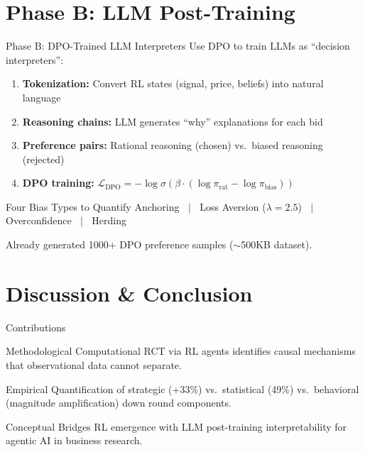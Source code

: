 \documentclass[aspectratio=169]{beamer}
\begin{document}
\section{Phase B: LLM Post-Training}

\begin{frame}{Phase B: DPO-Trained LLM Interpreters}
  Use DPO \citep{rafailov2023} to train LLMs as ``decision interpreters'':

  \begin{enumerate}
    \item \textbf{Tokenization:} Convert RL states (signal, price, beliefs) into natural language
    \item \textbf{Reasoning chains:} LLM generates ``why'' explanations for each bid
    \item \textbf{Preference pairs:} Rational reasoning (chosen) vs.\ biased reasoning (rejected)
    \item \textbf{DPO training:} $\mathcal{L}_{\text{DPO}} = -\log \sigma\!\left(\beta \cdot (\log \pi_{\text{rat}} - \log \pi_{\text{bias}})\right)$
  \end{enumerate}

  \vspace{0.3cm}
  \begin{block}{Four Bias Types to Quantify}
    Anchoring $\;\mid\;$ Loss Aversion ($\lambda=2.5$) $\;\mid\;$ Overconfidence $\;\mid\;$ Herding
  \end{block}

  \vspace{0.2cm}
  Already generated 1000+ DPO preference samples ($\sim$500KB dataset).
\end{frame}

\section{Discussion \& Conclusion}

\begin{frame}{Contributions}
  \begin{block}{Methodological}
    Computational RCT via RL agents identifies causal mechanisms that observational data cannot separate.
  \end{block}

  \begin{block}{Empirical}
    Quantification of strategic (+33\%) vs.\ statistical (49\%) vs.\ behavioral (magnitude amplification) down round components.
  \end{block}

  \begin{block}{Conceptual}
    Bridges RL emergence with LLM post-training interpretability for agentic AI in business research.
  \end{block}
\end{frame}
\end{document}
